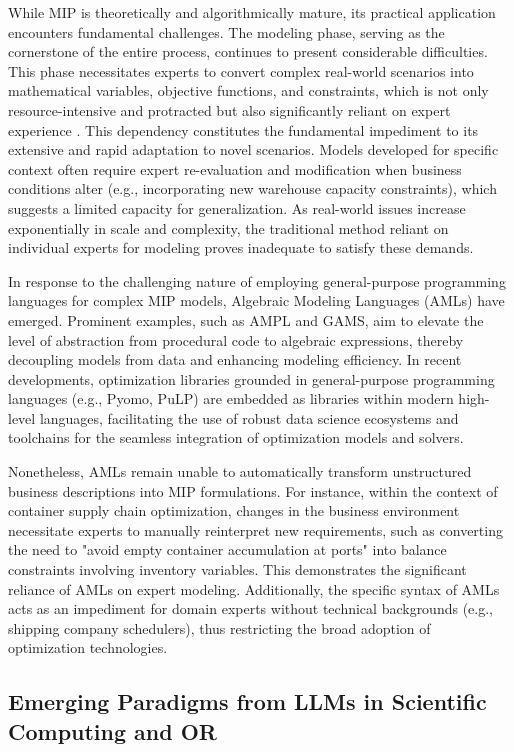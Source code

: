 \documentclass[preprint,12pt]{elsarticle}
\begin{document}
While MIP is theoretically and algorithmically mature, its practical application encounters fundamental challenges. The modeling phase, serving as the cornerstone of the entire process, continues to present considerable difficulties. This phase necessitates experts to convert complex real-world scenarios into mathematical variables, objective functions, and constraints, which is not only resource-intensive and protracted but also significantly reliant on expert experience \citep{liLargeLanguageModels2023}. This dependency constitutes the fundamental impediment to its extensive and rapid adaptation to novel scenarios. Models developed for specific context often require expert re-evaluation and modification when business conditions alter (e.g., incorporating new warehouse capacity constraints), which suggests a limited capacity for generalization. As real-world issues increase exponentially in scale and complexity, the traditional method reliant on individual experts for modeling proves inadequate to satisfy these demands.

In response to the challenging nature of employing general-purpose programming languages for complex MIP models, Algebraic Modeling Languages (AMLs) have emerged. Prominent examples, such as AMPL and GAMS, aim to elevate the level of abstraction from procedural code to algebraic expressions, thereby decoupling models from data and enhancing modeling efficiency. In recent developments, optimization libraries grounded in general-purpose programming languages (e.g., Pyomo, PuLP) are embedded as libraries within modern high-level languages, facilitating the use of robust data science ecosystems and toolchains for the seamless integration of optimization models and solvers.

Nonetheless, AMLs remain unable to automatically transform unstructured business descriptions into MIP formulations. For instance, within the context of container supply chain optimization, changes in the business environment necessitate experts to manually reinterpret new requirements, such as converting the need to "avoid empty container accumulation at ports" into balance constraints involving inventory variables. This demonstrates the significant reliance of AMLs on expert modeling. Additionally, the specific syntax of AMLs acts as an impediment for domain experts without technical backgrounds (e.g., shipping company schedulers), thus restricting the broad adoption of optimization technologies.

\subsection{Emerging Paradigms from LLMs in Scientific Computing and OR}
\end{document}
